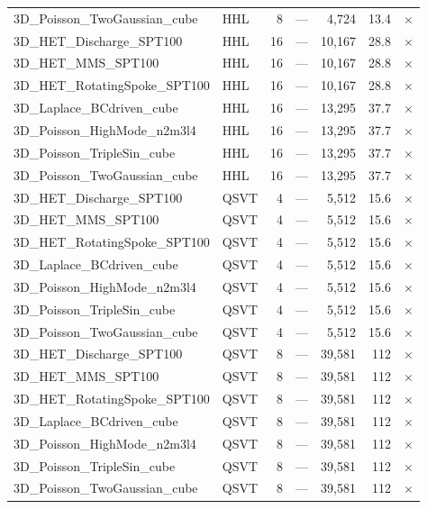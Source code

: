 \begin{table}[htbp]
\begin{tabular}{llrrrrl}
    3D\_Poisson\_TwoGaussian\_cube & HHL & 8 & --- & 4,724 & 13.4 & $\times$ \\
    3D\_HET\_Discharge\_SPT100 & HHL & 16 & --- & 10,167 & 28.8 & $\times$ \\
    3D\_HET\_MMS\_SPT100 & HHL & 16 & --- & 10,167 & 28.8 & $\times$ \\
    3D\_HET\_RotatingSpoke\_SPT100 & HHL & 16 & --- & 10,167 & 28.8 & $\times$ \\
    3D\_Laplace\_BCdriven\_cube & HHL & 16 & --- & 13,295 & 37.7 & $\times$ \\
    3D\_Poisson\_HighMode\_n2m3l4 & HHL & 16 & --- & 13,295 & 37.7 & $\times$ \\
    3D\_Poisson\_TripleSin\_cube & HHL & 16 & --- & 13,295 & 37.7 & $\times$ \\
    3D\_Poisson\_TwoGaussian\_cube & HHL & 16 & --- & 13,295 & 37.7 & $\times$ \\
    3D\_HET\_Discharge\_SPT100 & QSVT & 4 & --- & 5,512 & 15.6 & $\times$ \\
    3D\_HET\_MMS\_SPT100 & QSVT & 4 & --- & 5,512 & 15.6 & $\times$ \\
    3D\_HET\_RotatingSpoke\_SPT100 & QSVT & 4 & --- & 5,512 & 15.6 & $\times$ \\
    3D\_Laplace\_BCdriven\_cube & QSVT & 4 & --- & 5,512 & 15.6 & $\times$ \\
    3D\_Poisson\_HighMode\_n2m3l4 & QSVT & 4 & --- & 5,512 & 15.6 & $\times$ \\
    3D\_Poisson\_TripleSin\_cube & QSVT & 4 & --- & 5,512 & 15.6 & $\times$ \\
    3D\_Poisson\_TwoGaussian\_cube & QSVT & 4 & --- & 5,512 & 15.6 & $\times$ \\
    3D\_HET\_Discharge\_SPT100 & QSVT & 8 & --- & 39,581 & 112 & $\times$ \\
    3D\_HET\_MMS\_SPT100 & QSVT & 8 & --- & 39,581 & 112 & $\times$ \\
    3D\_HET\_RotatingSpoke\_SPT100 & QSVT & 8 & --- & 39,581 & 112 & $\times$ \\
    3D\_Laplace\_BCdriven\_cube & QSVT & 8 & --- & 39,581 & 112 & $\times$ \\
    3D\_Poisson\_HighMode\_n2m3l4 & QSVT & 8 & --- & 39,581 & 112 & $\times$ \\
    3D\_Poisson\_TripleSin\_cube & QSVT & 8 & --- & 39,581 & 112 & $\times$ \\
    3D\_Poisson\_TwoGaussian\_cube & QSVT & 8 & --- & 39,581 & 112 & $\times$ \\

\end{tabular}
\end{table}
